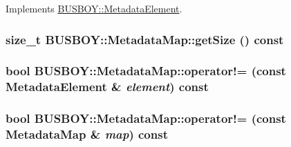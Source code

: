 Implements \hyperlink{classBUSBOY_1_1MetadataElement_a048a64f1d70affc5bfdd78a9958c5fb9}{BUSBOY::MetadataElement}.\hypertarget{classBUSBOY_1_1MetadataMap_a6652f5ac70ab29a2aaeabe4ebf5e937d}{
\subsubsection[{getSize}]{\setlength{\rightskip}{0pt plus 5cm}size\_\-t BUSBOY::MetadataMap::getSize () const}}
\label{classBUSBOY_1_1MetadataMap_a6652f5ac70ab29a2aaeabe4ebf5e937d}
\hypertarget{classBUSBOY_1_1MetadataMap_a9b9921e4bdfb78c6ed3c30cbdcbdf640}{
\subsubsection[{operator!=}]{\setlength{\rightskip}{0pt plus 5cm}bool BUSBOY::MetadataMap::operator!= (const {\bf MetadataElement} \& {\em element}) const}}
\label{classBUSBOY_1_1MetadataMap_a9b9921e4bdfb78c6ed3c30cbdcbdf640}
\hypertarget{classBUSBOY_1_1MetadataMap_a161a2e429cc1b2fd40fac48222a9b90b}{
\subsubsection[{operator!=}]{\setlength{\rightskip}{0pt plus 5cm}bool BUSBOY::MetadataMap::operator!= (const {\bf MetadataMap} \& {\em map}) const}}
\label{classBUSBOY_1_1MetadataMap_a161a2e429cc1b2fd40fac48222a9b90b}


